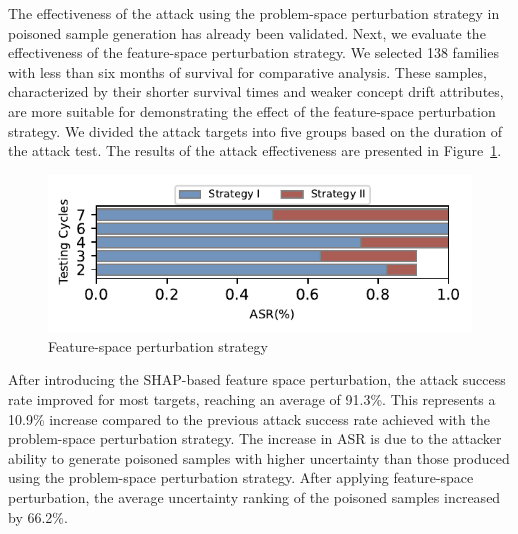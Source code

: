 \documentclass[conference,compsoc]{IEEEtran} %
\begin{document}
The effectiveness of the attack using the problem-space perturbation strategy in poisoned sample generation has already been validated. 
Next, we evaluate the effectiveness of the feature-space perturbation strategy.
We selected 138 families with less than six months of survival for comparative analysis. 
These samples, characterized by their shorter survival times and weaker concept drift attributes, are more suitable for demonstrating the effect of the feature-space perturbation strategy.
We divided the attack targets into five groups based on the duration of the attack test.
The results of the attack  effectiveness are presented in Figure~\ref{fig:feature-space perturbation strategy}.
\begin{figure}[h!]
	\centering
	\includegraphics[width=\linewidth,keepaspectratio]{Graph/Evaluation/Figure26.pdf}
	\caption{Feature-space perturbation strategy}
	\label{fig:feature-space perturbation strategy}
\end{figure}
After introducing the SHAP-based feature space perturbation, the attack success rate improved for most targets, reaching an average of 91.3\%.
This represents a 10.9\% increase compared to the previous attack success rate achieved with the problem-space perturbation strategy.
The increase in ASR is due to the attacker  ability to generate poisoned samples with higher uncertainty than those produced using the problem-space perturbation strategy. 
After applying feature-space perturbation, the average uncertainty ranking of the poisoned samples increased by 66.2\%.
\end{document}
